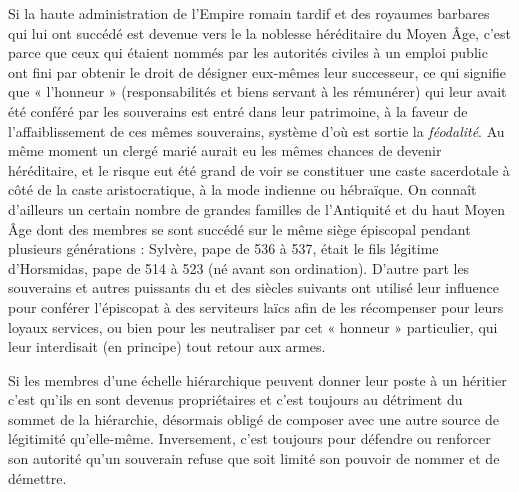  Si la haute administration de l'Empire romain tardif et des royaumes barbares qui lui ont succédé est devenue vers le  la noblesse héréditaire du Moyen Âge, c'est parce que ceux qui étaient nommés par les autorités civiles à un emploi public ont fini par obtenir le droit de désigner eux-mêmes leur successeur, ce qui signifie que « l'honneur » (responsabilités et biens servant à les rémunérer) qui leur avait été conféré par les souverains est entré dans leur patrimoine, à la faveur de l'affaiblissement de ces mêmes souverains, système d'où est sortie la \emph{féodalité}. Au même moment un clergé marié aurait eu les mêmes chances de devenir héréditaire, et le risque eut été grand de voir se constituer une caste sacerdotale à côté de la caste aristocratique, à la mode indienne ou hébraïque. On connaît d'ailleurs un certain nombre de grandes familles de l'Antiquité et du haut Moyen Âge dont des membres se sont succédé sur le même siège épiscopal pendant plusieurs générations : Sylvère, pape de 536 à 537, était le fils légitime d'Horsmidas, pape de 514 à 523 (né avant son ordination). D'autre part les souverains et autres puissants du  et des siècles suivants ont utilisé leur influence pour conférer l'épiscopat à des serviteurs laïcs afin de les récompenser pour leurs loyaux services, ou bien pour les neutraliser par cet « honneur » particulier, qui leur interdisait (en principe) tout retour aux armes. 

 Si les membres d'une échelle hiérarchique peuvent donner leur poste à un héritier c'est qu'ils en sont devenus propriétaires et c'est toujours au détriment du sommet de la hiérarchie, désormais obligé de composer avec une autre source de légitimité qu'elle-même. Inversement, c'est toujours pour défendre ou renforcer son autorité qu'un souverain refuse que soit limité son pouvoir de nommer et de démettre.

